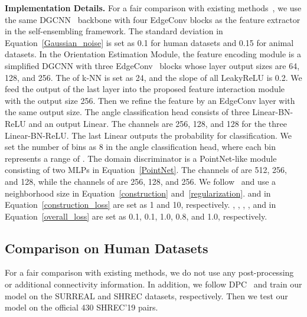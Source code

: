 \textbf{Implementation Details.}
For a fair comparison with existing methods~\cite{lang2021dpc, zeng2021corrnet3d},
we use the same DGCNN~\cite{wang2019dynamic} backbone with
four EdgeConv blocks as the feature extractor in the self-ensembling framework.
The standard deviation  in Equation~\eqref{Gaussian_noise} is set as 0.1 for human datasets and 0.15 for animal datasets.
In the Orientation Estimation Module,
the feature encoding module is a simplified DGCNN with
three EdgeConv~\cite{wang2019dynamic} blocks whose layer
output sizes are 64, 128, and 256.
The  of k-NN is set as 24,
and the slope of all LeakyReLU is 0.2.
We feed the output of the last layer into
the proposed feature interaction module
with the output size 256.
Then we refine the feature by an EdgeConv layer with the same output size.
The angle classification head consists of three Linear-BN-ReLU and an output Linear. 
The channels are 256, 128, and 128 for the three Linear-BN-ReLU.
The last Linear outputs the probability for classification.
We set the number of bins  as 8 in the angle classification head, where each bin represents a range of .
The domain discriminator is a PointNet-like module consisting of two MLPs in Equation~\eqref{PointNet}. 
The channels of  are 512, 256, and 128, while the channels of  are 256, 128, and 256.
We follow~\cite{lang2021dpc} and use a neighborhood size  in Equation~\eqref{construction} and~\eqref{regularization}. 
 and  in Equation~\eqref{construction_loss} are set as 1 and 10, respectively. , , , , and  in Equation~\eqref{overall_loss} are set as 0.1, 0.1, 1.0, 0.8, and 1.0, respectively.



\subsection{Comparison on Human Datasets}
For a fair comparison with existing methods, we do not use any post-processing or additional connectivity information.
In addition, we follow DPC~\cite{lang2021dpc} and train our model on the SURREAL and SHREC datasets, respectively. Then we test our model on the official 430 SHREC'19 pairs. 





